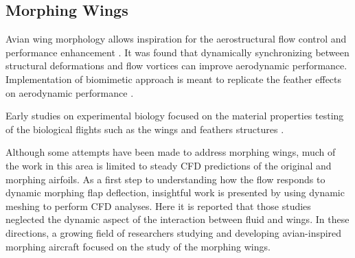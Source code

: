 \subsection{Morphing Wings}\label{Morphing Wings}



Avian wing morphology allows inspiration for the aerostructural flow control and performance enhancement \cite{Wong2022FlexibleMorphing}. 
%
It was found that dynamically synchronizing between structural deformations and flow vortices  can improve aerodynamic performance.
%
Implementation of biomimetic approach is meant to replicate the feather effects on aerodynamic performance \cite{Hedenstrom2017}. 

%
%

Early studies on experimental biology focused on the material properties testing of the biological flights such as the wings and feathers structures \cite{Bachmann2012FlexuralProperties}.




%

Although some attempts have been made to address morphing wings, much of the work in this area is limited to steady CFD predictions of the original and morphing airfoils.
%
As a first step to understanding how the flow responds to dynamic morphing flap deflection,  insightful work is presented by \citet{Abdessemed2018} using dynamic meshing to perform CFD analyses.
%
%
Here it is reported that those studies neglected the dynamic aspect of the interaction between fluid and wings.
%
In these directions, a growing field of researchers studying and developing avian-inspired morphing aircraft focused on the study of the morphing wings.
%

